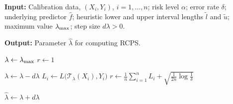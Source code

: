 \begin{algorithm}[b]
\caption{Pseudocode for computing $\hat{\lambda}$}
\label{alg:rcps-cal}

\textbf{Input:} Calibration data, $(X_i,Y_i)$, $i = 1, \ldots, n$; risk level $\alpha$; error rate $\delta$; underlying predictor $\hat{f}$; heuristic lower and upper interval lengths $\tilde{l}$ and $\tilde{u}$; maximum value $\lambda_{\rm max}$; step size $d\lambda > 0$.

\textbf{Output:} Parameter $\hat{\lambda}$ for computing RCPS.

\begin{algorithmic}[1]

\State $\lambda \gets \lambda_{\rm max}$
\State $r \gets 1$

    \State $\lambda \gets \lambda - d\lambda$
        \State $L_i \gets L\big(\mathcal{T}_{\lambda}(X_i),Y_i\big)$
    \EndFor
    \State $r \gets \frac{1}{n}\sum\limits_{i=1}^n L_i + \sqrt{\frac{1}{2n}\log \frac{1}{\delta}}$ 
\EndWhile

\State $\hat{\lambda} \gets \lambda + d\lambda$ 
\end{algorithmic}

\end{algorithm}